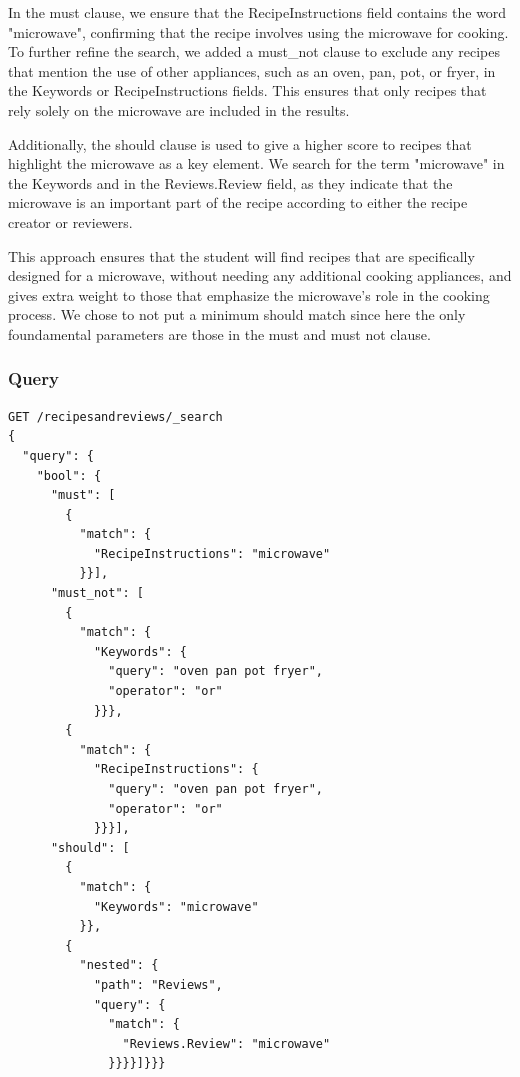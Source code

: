 \begin{enumerate}
    In the must clause, we ensure that the RecipeInstructions field contains the word "microwave", confirming that the recipe involves using the microwave for cooking. To further refine the search, we added a must\_not clause to exclude any recipes that mention the use of other appliances, such as an oven, pan, pot, or fryer, in the Keywords or RecipeInstructions fields. This ensures that only recipes that rely solely on the microwave are included in the results.

    Additionally, the should clause is used to give a higher score to recipes that highlight the microwave as a key element. We search for the term "microwave" in the Keywords and in the Reviews.Review field, as they indicate that the microwave is an important part of the recipe according to either the recipe creator or reviewers.

    This approach ensures that the student will find recipes that are specifically designed for a microwave, without needing any additional cooking appliances, and gives extra weight to those that emphasize the microwave's role in the cooking process. We chose to not put a minimum should match since here the only foundamental parameters are those in the must and must not clause.

    \subsubsection{Query}
    \begin{verbatim}
GET /recipesandreviews/_search
{
  "query": {
    "bool": {
      "must": [
        {
          "match": {
            "RecipeInstructions": "microwave"
          }}],
      "must_not": [
        {
          "match": {
            "Keywords": {
              "query": "oven pan pot fryer",
              "operator": "or"
            }}},
        {
          "match": {
            "RecipeInstructions": {
              "query": "oven pan pot fryer",
              "operator": "or"
            }}}],
      "should": [
        {
          "match": {
            "Keywords": "microwave"
          }},
        {
          "nested": {
            "path": "Reviews",
            "query": {
              "match": {
                "Reviews.Review": "microwave"
              }}}}]}}}
    \end{verbatim}


\end{enumerate}
